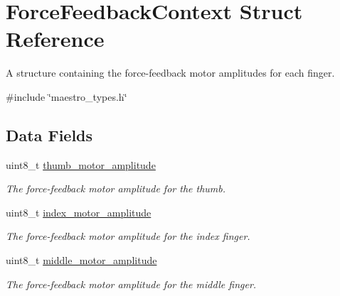 \hypertarget{struct_force_feedback_context}{}\section{Force\+Feedback\+Context Struct Reference}
\label{struct_force_feedback_context}


A structure containing the force-\/feedback motor amplitudes for each finger.  




{\ttfamily \#include \char`\"{}maestro\+\_\+types.\+h\char`\"{}}

\subsection*{Data Fields}
\begin{DoxyCompactItemize}
\item 
\mbox{\label{struct_force_feedback_context_adf8cccf14768d837be997b1deb680334}} 
uint8\+\_\+t \hyperlink{struct_force_feedback_context_adf8cccf14768d837be997b1deb680334}{thumb\+\_\+motor\+\_\+amplitude}
\begin{DoxyCompactList}\small\item\em The force-\/feedback motor amplitude for the thumb. \end{DoxyCompactList}\item 
\mbox{\label{struct_force_feedback_context_a8fd107476e5051e429353129234b4005}} 
uint8\+\_\+t \hyperlink{struct_force_feedback_context_a8fd107476e5051e429353129234b4005}{index\+\_\+motor\+\_\+amplitude}
\begin{DoxyCompactList}\small\item\em The force-\/feedback motor amplitude for the index finger. \end{DoxyCompactList}\item 
\mbox{\label{struct_force_feedback_context_a672c6cc7568ab9ddd631cc604f83d4f6}} 
uint8\+\_\+t \hyperlink{struct_force_feedback_context_a672c6cc7568ab9ddd631cc604f83d4f6}{middle\+\_\+motor\+\_\+amplitude}
\begin{DoxyCompactList}\small\item\em The force-\/feedback motor amplitude for the middle finger. \end{DoxyCompactList}\item 

\end{DoxyCompactItemize}
